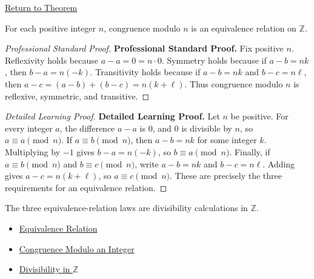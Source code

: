 \newpage
{}
\label{prf:congruence-modulo-integer-equivalence}

\begin{remark*}[Return]
\hyperref[thm:congruence-modulo-integer-equivalence]{Return to Theorem}
\end{remark*}

\begin{theorem*}
For each positive integer \(n\), congruence modulo \(n\) is an equivalence
relation on \(\mathbb{Z}\).
\end{theorem*}

\begin{proof}[Professional Standard Proof]
\LRAProofBodyStart
\textbf{Professional Standard Proof.}
Fix positive \(n\). Reflexivity holds because \(a-a=0=n\cdot 0\). Symmetry
holds because if \(a-b=nk\), then \(b-a=n(-k)\). Transitivity holds because
if \(a-b=nk\) and \(b-c=n\ell\), then \(a-c=(a-b)+(b-c)=n(k+\ell)\). Thus
congruence modulo \(n\) is reflexive, symmetric, and transitive.
\end{proof}

\begin{proof}[Detailed Learning Proof]
\LRAProofBodyStart
\textbf{Detailed Learning Proof.}
Let \(n\) be positive. For every integer \(a\), the difference \(a-a\) is
\(0\), and \(0\) is divisible by \(n\), so \(a\equiv a\pmod n\). If
\(a\equiv b\pmod n\), then \(a-b=nk\) for some integer \(k\). Multiplying by
\(-1\) gives \(b-a=n(-k)\), so \(b\equiv a\pmod n\). Finally, if
\(a\equiv b\pmod n\) and \(b\equiv c\pmod n\), write
\(a-b=nk\) and \(b-c=n\ell\). Adding gives
\(a-c=n(k+\ell)\), so \(a\equiv c\pmod n\). These are precisely the three
requirements for an equivalence relation.
\end{proof}

\begin{remark*}
The three equivalence-relation laws are divisibility calculations in
\(\mathbb{Z}\).
\end{remark*}

\begin{dependencies}
\begin{itemize}
  \item \hyperref[def:equivalence-relation]{Equivalence Relation}
  \item \hyperref[def:congruence-modulo-integer]{Congruence Modulo an Integer}
  \item \hyperref[def:divisibility-in-z]{Divisibility in \(\mathbb{Z}\)}
\end{itemize}
\end{dependencies}

\clearpage
